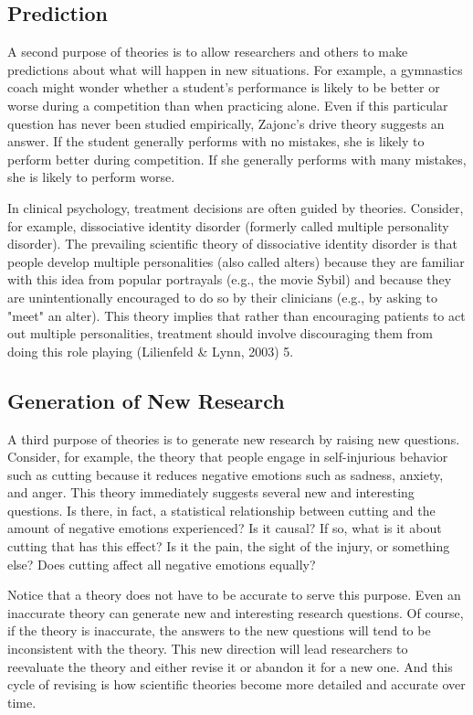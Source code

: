 \subsection{Prediction}


A second purpose of theories is to allow researchers and others to make predictions about what will happen in new situations. For example, a gymnastics coach might wonder whether a student's performance is likely to be better or worse during a competition than when practicing alone. Even if this particular question has never been studied empirically, Zajonc's drive theory suggests an answer. If the student generally performs with no mistakes, she is likely to perform better during competition. If she generally performs with many mistakes, she is likely to perform worse.


In clinical psychology, treatment decisions are often guided by theories. Consider, for example, dissociative identity disorder (formerly called multiple personality disorder). The prevailing scientific theory of dissociative identity disorder is that people develop multiple personalities (also called alters) because they are familiar with this idea from popular portrayals (e.g., the movie Sybil) and because they are unintentionally encouraged to do so by their clinicians (e.g., by asking to "meet" an alter). This theory implies that rather than encouraging patients to act out multiple personalities, treatment should involve discouraging them from doing this role playing (Lilienfeld \& Lynn, 2003) 5.


\subsection{Generation of New Research}

A third purpose of theories is to generate new research by raising new questions. Consider, for example, the theory that people engage in self-injurious behavior such as cutting because it reduces negative emotions such as
sadness, anxiety, and anger. This theory immediately suggests several new and interesting questions. Is there, in fact, a statistical relationship between cutting and the amount of negative emotions experienced? Is it causal? If so, what is it about cutting that has this effect? Is it the pain, the sight of the injury, or something else? Does cutting affect all negative emotions equally?


Notice that a theory does not have to be accurate to serve this purpose. Even an inaccurate theory can generate new and interesting research questions. Of course, if the theory is inaccurate, the answers to the new questions will tend to be inconsistent with the theory. This new direction will lead researchers to reevaluate the theory and either revise it or abandon it for a new one. And this cycle of revising is how scientific theories become more detailed and accurate over time.


